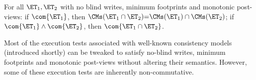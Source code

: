 
\begin{theorem}[Compositionality]  
\label{thm:compositional}   
For all $\ET_1, \ET_2$ with no blind writes, minimum footprints and monotonic post-views: 
if $\com{\ET_1}$, 
then $\CMs(\ET_1 \cap \ET_2) {=} \CMs(\ET_1) \cap \CMs(\ET_2)$;
if $\com{\ET_1} \land \com{\ET_2}$, then $\com{\ET_1 \cap \ET_2}$.
\end{theorem}

Most of the execution tests associated with well-known consistency models (introduced shortly)
can be tweaked to satisfy no-blind writes, minimum footprints and monotonic post-views 
without altering their semantics. However, some of these execution tests
are inherently non-commutative.





